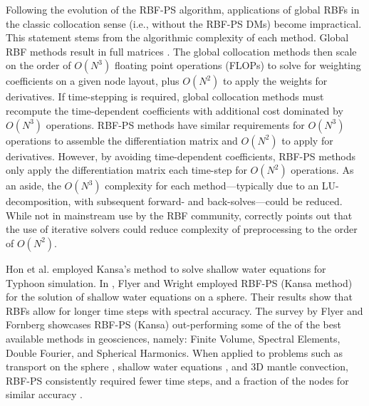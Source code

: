 \documentclass{report}
\begin{document}
{Following the evolution of the RBF-PS algorithm, applications of global RBFs in the classic collocation sense (i.e., without the RBF-PS DMs) become impractical. This statement stems from the algorithmic complexity of each method. 
Global RBF methods result in full matrices \cite{Fasshauer2007}. The global collocation methods then scale on the order of $O(N^3)$ floating point operations (FLOPs) to solve for weighting coefficients on a given node layout, plus $O(N^2)$ to apply the weights for derivatives. If time-stepping is required, global collocation methods must recompute the time-dependent coefficients with additional cost dominated by $O(N^3)$ operations. RBF-PS methods have similar requirements for $O(N^3)$ operations to assemble the differentiation matrix and $O(N^2)$ to apply for derivatives. However, by avoiding time-dependent coefficients, RBF-PS methods only apply the differentiation matrix each time-step for $O(N^2)$ operations. As an aside, the $O(N^3)$ complexity for each method---typically due to an LU-decomposition, with subsequent forward- and back-solves---could be reduced. While not in mainstream use by the RBF community, \cite{Morse2005} correctly points out that the use of iterative solvers could reduce complexity of preprocessing to the order of $O(N^2)$. 

Hon et al. \cite{Hon1999} employed Kansa's method to solve shallow water equations for Typhoon simulation.
In \cite{FlyerWright09}, Flyer and Wright employed RBF-PS (Kansa method) for the solution of shallow water equations on a sphere. Their 
results show that RBFs allow for longer time steps with spectral accuracy. The survey \cite{FlyerFornberg11} by Flyer and Fornberg showcases RBF-PS (Kansa) out-performing some of the of the best available methods in geosciences, namely: Finite Volume, Spectral Elements, Double Fourier, and Spherical Harmonics. When applied to problems such as transport on the sphere \cite{FlyerWright07}, shallow water equations \cite{FlyerWright09}, and 3D mantle convection\cite{WrightFlyerYuen10}, RBF-PS consistently required fewer time steps, and a fraction of the nodes for similar accuracy \cite{FlyerFornberg11}. 

%

}
\end{document}

